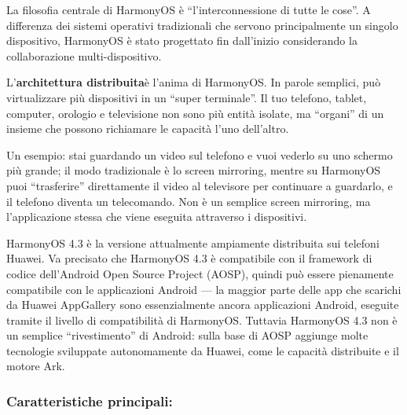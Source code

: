 


La filosofia centrale di HarmonyOS è “l'interconnessione di tutte le cose”. A differenza dei sistemi operativi tradizionali che servono principalmente un singolo dispositivo, HarmonyOS è stato progettato fin dall'inizio considerando la collaborazione multi-dispositivo.

L'\textbf{architettura distribuita}è l'anima di HarmonyOS. In parole semplici, può virtualizzare più dispositivi in un “super terminale”. Il tuo telefono, tablet, computer, orologio e televisione non sono più entità isolate, ma “organi” di un insieme che possono richiamare le capacità l'uno dell'altro.

Un esempio: stai guardando un video sul telefono e vuoi vederlo su uno schermo più grande; il modo tradizionale è lo screen mirroring, mentre su HarmonyOS puoi “trasferire” direttamente il video al televisore per continuare a guardarlo, e il telefono diventa un telecomando. Non è un semplice screen mirroring, ma l'applicazione stessa che viene eseguita attraverso i dispositivi.


HarmonyOS 4.3 è la versione attualmente ampiamente distribuita sui telefoni Huawei. Va precisato che HarmonyOS 4.3 è compatibile con il framework di codice dell'Android Open Source Project (AOSP), quindi può essere pienamente compatibile con le applicazioni Android — la maggior parte delle app che scarichi da Huawei AppGallery sono essenzialmente ancora applicazioni Android, eseguite tramite il livello di compatibilità di HarmonyOS. Tuttavia HarmonyOS 4.3 non è un semplice “rivestimento” di Android: sulla base di AOSP aggiunge molte tecnologie sviluppate autonomamente da Huawei, come le capacità distribuite e il motore Ark.

\subsubsection*{Caratteristiche principali:}

